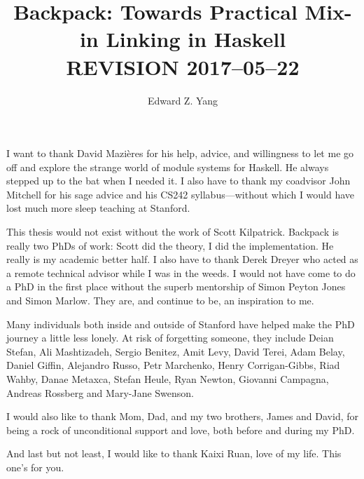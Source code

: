 \documentclass{report}
\begin{document}
\title{Backpack: Towards Practical Mix-in Linking in Haskell \\ REVISION 2017--05--22}
\author{Edward Z. Yang}

\beforepreface%
    I want to thank David Mazi\`eres for his help, advice, and
    willingness to let me go off and explore the strange world
    of module systems for Haskell.  He always stepped up to the bat
    when I needed it.  I also have to thank my coadvisor John
    Mitchell for his sage advice and his CS242 syllabus---without
    which I would have lost much more sleep teaching at Stanford.

    This thesis would not exist without the work of Scott Kilpatrick.
    Backpack is really two PhDs of work: Scott did the theory, I did the
    implementation.  He really is my academic better half.  I also have
    to thank Derek Dreyer who acted as a remote technical advisor
    while I was in the weeds.
    I would not have come to do a PhD in the first place without the
    superb mentorship of Simon Peyton Jones and Simon Marlow.  They are,
    and continue to be, an inspiration to me.

    Many individuals both inside and outside of Stanford have helped
    make the PhD journey a little less lonely.  At risk of forgetting
    someone, they include Deian Stefan, Ali Mashtizadeh, Sergio Benitez,
    Amit Levy, David Terei, Adam Belay, Daniel Giffin, Alejandro Russo,
    Petr Marchenko, Henry Corrigan-Gibbs, Riad Wahby, Danae Metaxca,
    Stefan Heule, Ryan Newton, Giovanni Campagna, Andreas Rossberg and
    Mary-Jane Swenson.

    I would also like to thank Mom, Dad, and my two brothers, James
    and David, for being a rock of unconditional support and love,
    both before and during my PhD.

    And last but not least, I would like to thank Kaixi Ruan, love
    of my life.  This one's for you.
\afterpreface%
















\end{document}
